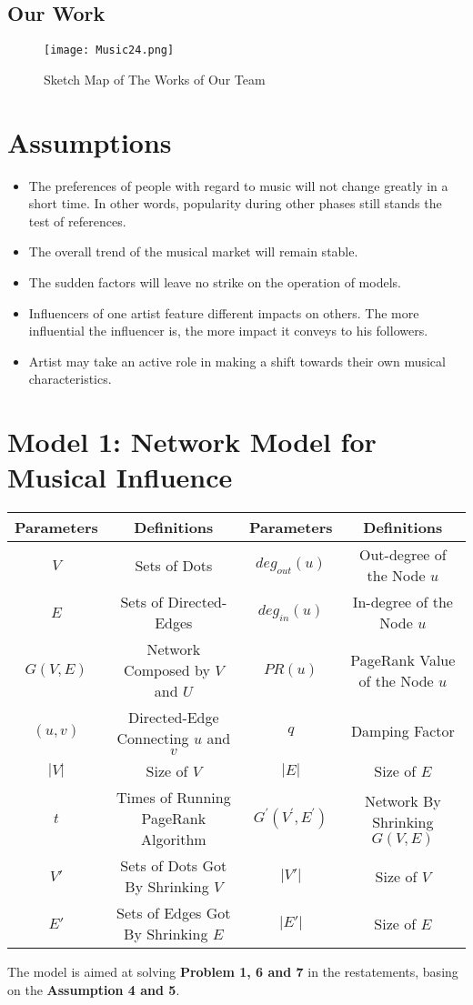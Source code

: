 \documentclass[12pt]{article}
\begin{document}
\subsection{Our Work}
\begin{figure}[h]
\centering
	\texttt{[image: Music24.png]}
	\caption{Sketch Map of The Works of Our Team}
\end{figure}
\section{Assumptions}
\begin{itemize}
	\item The preferences of people with regard to music will not change greatly in a short time. In other words, popularity during other phases still stands the test of references.
	\item The overall trend of the musical market will remain stable.
	\item The sudden factors will leave no strike on the operation of models.
	\item Influencers of one artist feature different impacts on others. The more influential the influencer is, the more impact it conveys to his followers.
	\item Artist may take an active role in making a shift towards their own musical characteristics.
\end{itemize}
\clearpage
\section{Model 1: Network Model for Musical Influence}
\begin{table}[htp]
\centering
	\begin{tabular}{|c|c||c|c|}
	\hline
		Parameters &Definitions &Parameters &Definitions\\
		\hline
		$V$ & Sets of Dots &$deg_{out}(u)$ &Out-degree of the Node $u$\\
		$E$ & Sets of Directed-Edges & $deg_{in}(u)$ &In-degree of the Node $u$\\
		$G(V,E)$ & Network Composed by $V$ and $U$ &$PR(u)$ & PageRank Value of the Node $u$\\
		$(u,v)$ & Directed-Edge Connecting $u$ and $v$ &$q$ & Damping Factor\\
		$|V|$ &Size of $V$ &$|E|$ &Size of $E$\\
		$t$&Times of Running PageRank Algorithm &$G^{'}(V^{'},E^{'})$ &Network By Shrinking $G(V,E)$\\
		$V'$&Sets of Dots Got By Shrinking $V$ &$|V'|$&Size of $V$\\
		$E'$&Sets of Edges Got By Shrinking $E$ &$|E'|$&Size of $E$\\
		\hline
	\end{tabular}
\end{table}
The model is aimed at solving {\textbf{Problem 1, 6 and 7}} in the restatements, basing on the {\textbf{Assumption 4 and 5}}. 
\end{document}
